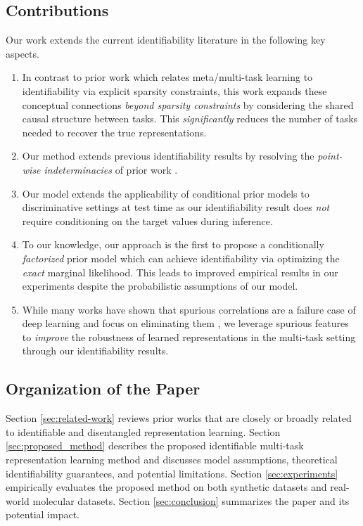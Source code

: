 \documentclass[10pt]{article} %
\theoremstyle{plain}
\theoremstyle{definition}
\begin{document}
\subsection{Contributions}
Our work extends the current identifiability literature in the following key aspects.
\begin{enumerate}
    \item In contrast to prior work \citep{Lachapelle_Deleu_Mahajan_Mitliagkas_Bengio_Lacoste-Julien_Bertrand_2023,Fumero_Wenzel_Zancato_Achille_Rodolà_Soatto_Schölkopf_Locatello_2023} which relates meta/multi-task learning to identifiability via explicit sparsity constraints, this work expands these conceptual connections \emph{beyond sparsity constraints} by considering the shared causal structure between tasks. This \emph{significantly} reduces the number of tasks needed to recover the true representations.
    \item Our method extends previous identifiability results by resolving the \emph{point-wise indeterminacies} of prior work \citep{Khemakhem_Kingma_Monti_Hyvarinen_2020,Lu_Wu_Hernandez-Lobato_Scholkopf_2022}.
    \item Our model extends the applicability of conditional prior models to discriminative settings at test time as our identifiability result does \emph{not} require conditioning on the target values during inference.
    \item To our knowledge, our approach is the first to propose a conditionally \emph{factorized} prior model which can achieve identifiability via optimizing the \emph{exact} marginal likelihood. This leads to improved empirical results in our experiments despite the probabilistic assumptions of our model.
    \item While many works have shown that spurious correlations are a failure case of deep learning and focus on eliminating them \citep{rojas2018invariant,arjovsky2019invariant,krueger2021out,eastwood2022probable,Lu_Wu_Hernandez-Lobato_Scholkopf_2022,kirichenko2023last}, we leverage spurious features to \emph{improve} the robustness of learned representations in the multi-task setting through our identifiability results.
\end{enumerate}

\subsection{Organization of the Paper}
Section \ref{sec:related-work} reviews prior works that are closely or broadly related to identifiable and disentangled representation learning.
Section \ref{sec:proposed_method} describes the proposed identifiable multi-task representation learning method and discusses model assumptions, theoretical identifiability guarantees, and potential limitations. 
Section \ref{sec:experiments} empirically evaluates the proposed method on both synthetic datasets and real-world molecular datasets. Section \ref{sec:conclusion} summarizes the paper and its potential impact.
\end{document}

